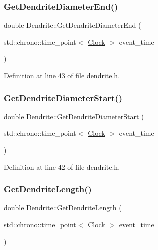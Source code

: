 \subsubsection{\texorpdfstring{Get\+Dendrite\+Diameter\+End()}{GetDendriteDiameterEnd()}}
{\footnotesize\ttfamily double Dendrite\+::\+Get\+Dendrite\+Diameter\+End (\begin{DoxyParamCaption}\item[{std\+::chrono\+::time\+\_\+point$<$ \mbox{\hyperlink{universe_8h_a0ef8d951d1ca5ab3cfaf7ab4c7a6fd80}{Clock}} $>$}]{event\+\_\+time }\end{DoxyParamCaption})\hspace{0.3cm}{\ttfamily [inline]}}



Definition at line 43 of file dendrite.\+h.

\mbox{\label{class_dendrite_aa103a34ce3d3525b350cb02c0a7855ea}} 
\subsubsection{\texorpdfstring{Get\+Dendrite\+Diameter\+Start()}{GetDendriteDiameterStart()}}
{\footnotesize\ttfamily double Dendrite\+::\+Get\+Dendrite\+Diameter\+Start (\begin{DoxyParamCaption}\item[{std\+::chrono\+::time\+\_\+point$<$ \mbox{\hyperlink{universe_8h_a0ef8d951d1ca5ab3cfaf7ab4c7a6fd80}{Clock}} $>$}]{event\+\_\+time }\end{DoxyParamCaption})\hspace{0.3cm}{\ttfamily [inline]}}



Definition at line 42 of file dendrite.\+h.

\mbox{\label{class_dendrite_a64ebf49c488bb0225e1e5c8a8d9935d9}} 
\subsubsection{\texorpdfstring{Get\+Dendrite\+Length()}{GetDendriteLength()}}
{\footnotesize\ttfamily double Dendrite\+::\+Get\+Dendrite\+Length (\begin{DoxyParamCaption}\item[{std\+::chrono\+::time\+\_\+point$<$ \mbox{\hyperlink{universe_8h_a0ef8d951d1ca5ab3cfaf7ab4c7a6fd80}{Clock}} $>$}]{event\+\_\+time }\end{DoxyParamCaption})\hspace{0.3cm}{\ttfamily [inline]}}



